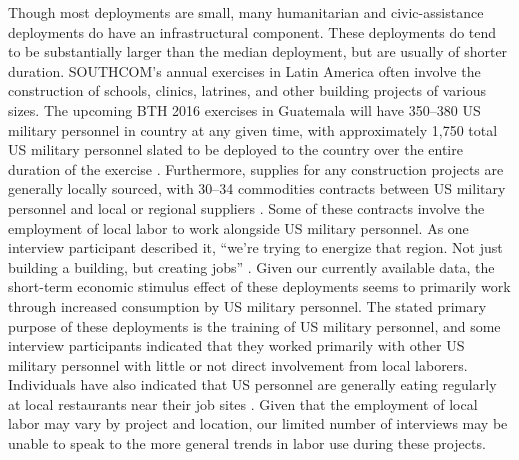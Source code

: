 \documentclass[12pt]{article}
\begin{document}
\begin{doublespace}
Though most deployments are small, many humanitarian and civic-assistance deployments do have an infrastructural component. These deployments do tend to be substantially larger than the median deployment, but are usually of shorter duration. SOUTHCOM's annual exercises in Latin America often involve the construction of schools, clinics, latrines, and other building projects of various sizes. The upcoming BTH 2016 exercises in Guatemala will have 350--380 US military personnel in country at any given time, with approximately 1,750 total US military personnel slated to be deployed to the country over the entire duration of the exercise \cite{CPT20160309}. Furthermore, supplies for any construction projects are generally locally sourced, with 30--34 commodities contracts between US military personnel and local or regional suppliers \cite{CPT20160309}. Some of these contracts involve the employment of local labor to work alongside US military personnel. As one interview participant described it, ``we're trying to energize that region. Not just building a building, but creating jobs'' \cite{CPT20160309}. Given our currently available data, the short-term economic stimulus effect of these deployments seems to primarily work through increased consumption by US military personnel. The stated primary purpose of these deployments is the training of US military personnel, and some interview participants indicated that they worked primarily with other US military personnel with little or not direct involvement from local laborers. Individuals have also indicated that US personnel are generally eating regularly at local restaurants near their job sites \cite{SFC20160226,SFC20160308}. Given that the employment of local labor may vary by project and location, our limited number of interviews may be unable to speak to the more general trends in labor use during these projects.


\end{doublespace}
\end{document}
